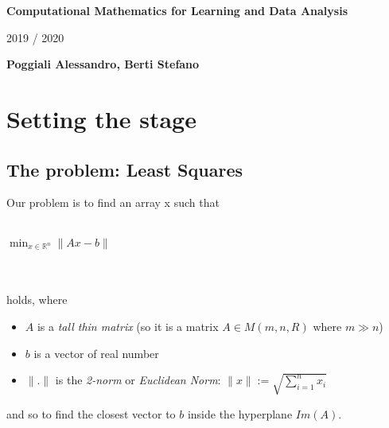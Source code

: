 \documentclass{article}
\begin{document}
\thispagestyle{plain}
\begin{center}
    \Large
    \textbf{Computational Mathematics for Learning and Data Analysis}

    \vspace{0.4cm}
    \large
    2019 / 2020

    \vspace{0.4cm}
    \textbf{Poggiali Alessandro, Berti Stefano}

    \vspace{0.9cm}
\end{center}

\section{Setting the stage}\label{sec:setting-the-stage}

\subsection{The problem: Least Squares}\label{subsec:linear-square-problem}
Our problem is to find an array x such that \\\\
\centerline{$\min_{x \in \mathds{R}^n}\|Ax-b\|$} \\\\
holds, where
\begin{itemize}
	\item $A$ is a \textit{tall thin matrix} (so it is a matrix $A\in M(m, n, R)$ where $m \gg n$)
	\item $b$ is a vector of real number
	\item $\|.\|$ is the \textit{2-norm} or \textit{Euclidean Norm}: $\|x\| := \sqrt{\sum_{i=1}^n x_i}$
\end{itemize}
and so to find the closest vector to $b$ inside the hyperplane $Im(A)$.

\end{document}
